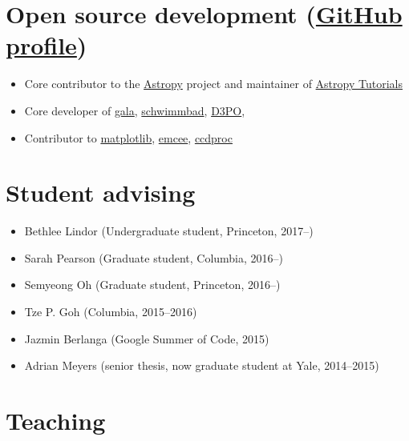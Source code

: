 \documentclass[12pt,letterpaper]{article}
\begin{document}
\section*{Open source development (\href{https://github.com/adrn}{GitHub profile})}

\begin{itemize}

	\item Core contributor to the \href{http://www.astropy.org/}{Astropy} project and maintainer of \href{http://tutorials.astropy.org/}{Astropy Tutorials}
	\item Core developer of \href{http://gala.adrian.pw}{gala}, \href{https://github.com/adrn/schwimmbad}{schwimmbad}, \href{http://d3po.org}{D3PO},
	\item Contributor to \href{http://matplotlib.org/}{matplotlib}, \href{http://dan.iel.fm/emcee/current/}{emcee}, \href{https://github.com/astropy/ccdproc}{ccdproc}

\end{itemize}


\section*{Student advising}

\begin{itemize}
	\item Bethlee Lindor (Undergraduate student, Princeton, 2017--)
    \item Sarah Pearson (Graduate student, Columbia, 2016--)
    \item Semyeong Oh (Graduate student, Princeton, 2016--)
	\item Tze P. Goh (Columbia, 2015--2016)
	\item Jazmin Berlanga (Google Summer of Code, 2015)
	\item Adrian Meyers (senior thesis, now graduate student at Yale, 2014--2015)
\end{itemize}

\section*{Teaching}
\end{document}
